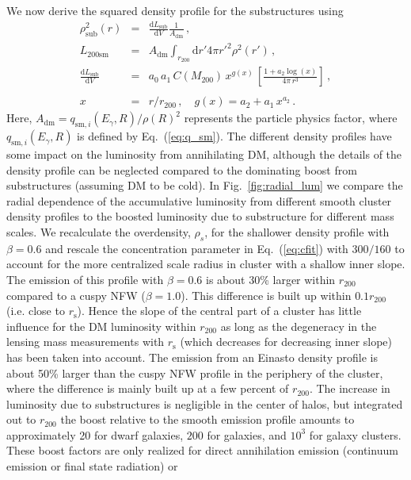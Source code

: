 \documentclass[10pt,aps,pra,reprint,amsmath,amsfonts,amssymb,showpacs,nofootinbib,floatfix]{revtex4-1}
\newcommand{\rmn}{\mathrm}
\newcommand{\s}{\rmn{s}}
\newcommand{\sm}{\rmn{sm}}
\newcommand{\dd}{\rmn{d}}
\newcommand{\rhos}{\ensuremath{\rho_s}}
\newcommand{\rvir}{r_{200}}
\newcommand{\mvir}{M_{200}}
\newcommand{\eg}{E_\gamma}
\begin{document}
We now derive the squared density profile for the substructures
using
\begin{eqnarray}
\rho_\rmn{sub}^2(r) &=& \frac{\dd L_\rmn{sub}}{\dd V} \frac{1}{A_{\rmn{dm}}}\,,\label{eq:rho_sub}\\
L_{200\sm} &=& A_{\rmn{dm}} \int_{\rvir} \dd r' 4\pi r'^2 \rho^2(r')\,,\label{eq:Lsm}\\
 \frac{\dd L_\rmn{sub}}{\dd V} &=& a_0\,a_1\,C(\mvir)\,x^{g(x)}\,
\left[\frac{1+a_2\log(x)}{4\pi\,r^3}\right]\,,\nonumber\\
\\
x &=& r/\rvir\,,\quad g(x) = a_2+a_1\,x^{a_2}\,.\label{eq:xvir}
\end{eqnarray}
Here, $A_{\rmn{dm}} = q_{\rmn{sm},i}(\eg,R) / \rho(R)^2$ represents
the particle physics factor, where $q_{\rmn{sm},i}(\eg,R)$ is defined by
Eq.~(\ref{eq:q_sm}). The different density profiles have some impact
on the luminosity from annihilating DM, although the details of the
density profile can be neglected compared to the dominating boost from
substructures (assuming DM to be cold). In Fig.~\ref{fig:radial_lum}
we compare the radial dependence of the accumulative luminosity from
different smooth cluster density profiles to the boosted luminosity
due to substructure for different mass scales. We recalculate the
overdensity, $\rhos$, for the shallower density profile with
$\beta=0.6$ and rescale the concentration parameter in
Eq.~(\ref{eq:cfit}) with $300/160$ \cite{2011ApJ...728L..39N} to
account for the more centralized scale radius in cluster with a
shallow inner slope. The emission of this profile with $\beta=0.6$ is
about 30\% larger within $\rvir$ compared to a cuspy NFW
($\beta=1.0$). This difference is built up within $0.1\rvir$
(i.e. close to $r_\s$). Hence the slope of the central part of a
cluster has little influence for the DM luminosity within $\rvir$ as
long as the degeneracy in the lensing mass measurements with $r_\s$
(which decreases for decreasing inner slope) has been taken into
account. The emission from an Einasto density profile is about 50\%
larger than the cuspy NFW profile in the periphery of the cluster,
where the difference is mainly built up at a few percent of
$\rvir$. The increase in luminosity due to substructures is negligible
in the center of halos, but integrated out to $\rvir$ the boost
relative to the smooth emission profile amounts to approximately 20
for dwarf galaxies, $200$ for galaxies, and $10^3$ for galaxy
clusters. These boost factors are only realized for direct
annihilation emission (continuum emission or final state radiation) or
\end{document}
